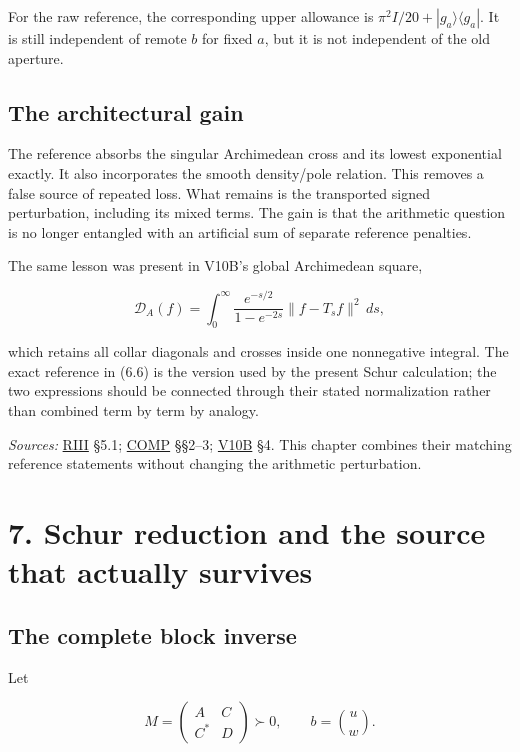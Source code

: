 \documentclass[
  10pt,
  a4paper,
  10pt,
  oneside,
  openany]{book}
\begin{document}
For the raw reference, the corresponding upper allowance is
\(\pi^2I/20+|g_a\rangle\langle g_a|\). It is still independent of remote
\(b\) for fixed \(a\), but it is not independent of the old aperture.

\subsection{The architectural gain}\label{the-architectural-gain}

The reference absorbs the singular Archimedean cross and its lowest
exponential exactly. It also incorporates the smooth density/pole
relation. This removes a false source of repeated loss. What remains is
the transported signed perturbation, including its mixed terms. The gain
is that the arithmetic question is no longer entangled with an
artificial sum of separate reference penalties.

The same lesson was present in V10B's global Archimedean square,

\[
\mathcal D_A(f)=\int_0^\infty
\frac{e^{-s/2}}{1-e^{-2s}}\|f-T_sf\|^2\,ds,
\tag{6.13}\label{eq:6.13}
\]

which retains all collar diagonals and crosses inside one nonnegative
integral. The exact reference in (6.6) is the version used by the
present Schur calculation; the two expressions should be connected
through their stated normalization rather than combined term by term by
analogy.

\emph{Sources:} \hyperref[source-riii]{RIII} §5.1;
\hyperref[source-comp]{COMP} §§2--3; \hyperref[source-v10b]{V10B} §4.
This chapter combines their matching reference statements without
changing the arithmetic perturbation.

\section{7. Schur reduction and the source that actually
survives}\label{ch-schur}

\subsection{The complete block
inverse}\label{the-complete-block-inverse}

Let

\[
M=\begin{pmatrix}A&C\\C^*&D\end{pmatrix}\succ0,
\qquad b=\binom uw.
\tag{7.1}\label{eq:7.1}
\]
\end{document}
